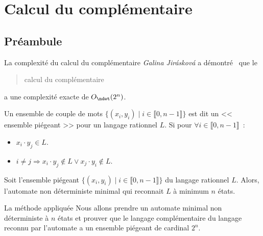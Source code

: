 
\section{Calcul du complémentaire}


\subsection{Préambule}

\begin{frame}{\myframetitle}
  \begin{block}{La complexité du calcul du complémentaire}
    \textit{Galina Jirásková} a démontré~\cite{JIRASKOVA2005287} que le
    \blockquote{calcul du complémentaire} a une complexité exacte de
    \(O_{\ndet}(2^n)\).
  \end{block}
\end{frame}

\begin{frame}{\myframetitle}
  \begin{definition}
    Un ensemble de couple de mots \(\{(x_i, y_i) \mid i \in \llbracket 0, n - 1
    \rrbracket\}\) est dit un << ensemble piégeant >> pour un langage rationnel
    \(L\). Si pour \(\forall i \in \llbracket 0, n - 1 \rrbracket\)~:
    \begin{itemize}
      \item \(x_i \cdot y_j \in L\).
      \item \(i \neq j \Longrightarrow x_i \cdot y_j \notin L \lor
        x_j \cdot y_i \notin L\).
    \end{itemize}
  \end{definition}

  \pause[]

  \begin{lemma}
    Soit l'ensemble piégeant \(\{(x_i, y_i) \mid i \in \llbracket 0, n - 1
    \rrbracket\}\) du langage rationnel \(L\). Alors, l'automate non
    déterministe minimal qui reconnait \(L\) à minimum \(n\) états.
  \end{lemma}
\end{frame}

\begin{frame}{\myframetitle}
  \begin{block}{La méthode appliquée}
    Nous allons prendre un automate minimal non déterministe à \(n\) états et
    prouver que le langage complémentaire du langage reconnu par l'automate a un
    ensemble piégeant de cardinal \(2^n\).
  \end{block}
\end{frame}

